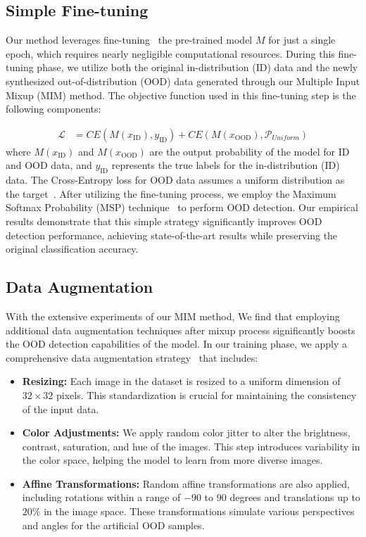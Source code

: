 \documentclass[letterpaper]{article} %
\begin{document}
\subsection{Simple Fine-tuning}
\vspace{-0.1cm}
Our method leverages fine-tuning~\cite{finetuning} the pre-trained model $M$ for just a single epoch, which requires nearly negligible computational resources.
During this fine-tuning phase, we utilize both the original in-distribution (ID) data and the newly synthesized out-of-distribution (OOD) data generated through our Multiple Input Mixup (MIM) method.
The objective function used in this fine-tuning step is the following components: 

\begin{align*}
    \mathcal{L} &= CE(M(x_{\text{ID}}), y_{\text{ID}}) + CE(M(x_{\text{OOD}}), \mathcal{P}_{Uniform})
\end{align*}
where $M(x_{\text{ID}})$ and $M(x_{\text{OOD}})$ are the output probability of the model for ID and OOD data, and $y_{\text{ID}}$ represents the true labels for the in-distribution (ID) data. The Cross-Entropy loss for OOD data assumes a uniform distribution as the target~\cite{uniform}.
After utilizing the fine-tuning process, we employ the Maximum Softmax Probability (MSP) technique~\cite{MSP} to perform OOD detection. 
Our empirical results demonstrate that this simple strategy significantly improves OOD detection performance, achieving state-of-the-art results while preserving the original classification accuracy.

\subsection{Data Augmentation}
\vspace{-0.1cm}
With the extensive experiments of our MIM method, We find that employing additional data augmentation techniques after mixup process significantly boosts the OOD detection capabilities of the model.
In our training phase, we apply a comprehensive data augmentation strategy~\cite{imagenet_aug} that includes:
\vspace{-0.1cm}
\begin{itemize}
    \item \textbf{Resizing:} Each image in the dataset is resized to a uniform dimension of $32 \times 32$ pixels. This standardization is crucial for maintaining the consistency of the input data.
    \item \textbf{Color Adjustments:} We apply random color jitter to alter the brightness, contrast, saturation, and hue of the images. This step introduces variability in the color space, helping the model to learn from more diverse images.
    \item \textbf{Affine Transformations:} Random affine transformations are also applied, including rotations within a range of $-90$ to $90$ degrees and translations up to $20\%$ in the image space. These transformations simulate various perspectives and angles for the artificial OOD samples.
\end{itemize}
\end{document}
